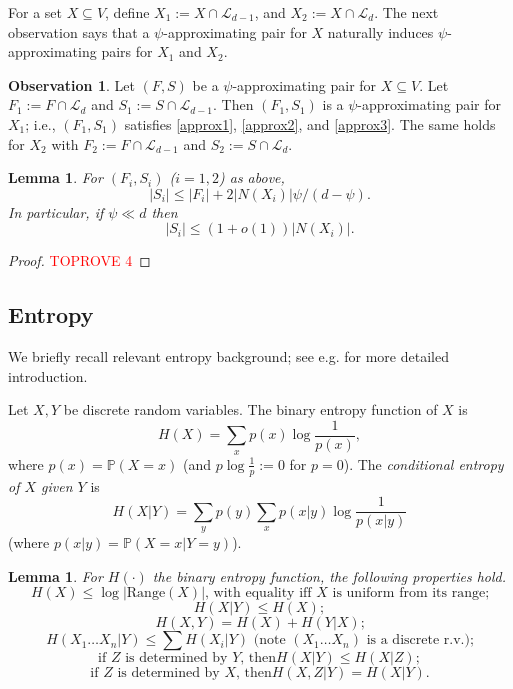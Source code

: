 \documentclass{amsart}
\newtheorem{lem}[thm]{Lemma}
\theoremstyle{definition}
\newtheorem{obs}[thm]{Observation}
\newcommand{\cL}{\mathcal{L} }
\newcommand{\beq}[1]{\begin{equation}\label{#1}}
\newcommand{\enq}[0]{\end{equation}}
\newcommand{\sub}[0]{\subseteq}
\newcommand{\0}[0]{\emptyset}
\newcommand{\pr}[0]{\mathbb{P}}
\begin{document}
For a set $X\subseteq V$, define $X_1:=X \cap \cL_{d-1}$, and $X_2:=X \cap \cL_d$. The next observation says that a $\psi$-approximating pair for $X$ naturally induces $\psi$-approximating pairs for $X_1$ and $X_2$.

\begin{obs}\label{prop:SFappro1}
Let $(F,S)$ be a $\psi$-approximating pair for $X \sub V$. Let $F_1:=F \cap \cL_d$ and $S_1:=S \cap \cL_{d-1}$. 
Then $(F_1, S_1)$ is a $\psi$-approximating pair for $X_1$; i.e., $(F_1,S_1)$ satisfies \eqref{approx1}, \eqref{approx2}, and \eqref{approx3}. The same holds for $X_2$ with $F_2 :=F \cap \cL_{d-1}$ and $S_2:=S \cap \cL_d$.
\end{obs}

\begin{lem}
For $(F_i,S_i)$ ($i=1,2$) as above,
\beq{S.F.gap} |S_i|\le |F_i|+2|N(X_i)|\psi/(d-\psi).\enq
In particular, if $\psi \ll d$ then
\beq{sf.ub} |S_i| \le (1+o(1))|N(X_i)|.\enq
\end{lem}

\begin{proof}\textcolor{red}{TOPROVE 4}\end{proof}





\subsection{Entropy} \label{Entropy}
We briefly recall relevant entropy background; see e.g. \cite{McEliece} for more detailed introduction.

Let $X, Y$ be discrete random variables. The binary entropy function of $X$ is
\[ H(X)=\sum_x p(x) \log {\frac{1}{p(x)}},\]
where $p(x)=\pr(X=x)$ (and $p \log \frac{1}{p} :=0$ for $p=0$).
The \emph{conditional entropy of $X$ given $Y$} is
\beq{condent}
H(X|Y)=\sum_y p(y)\sum_x p(x|y)\log \frac{1}{p(x|y)}
\enq
(where $p(x|y)=\pr(X=x|Y=y)$).



\begin{lem}\label{entropyprop} For $H(\cdot)$ the binary entropy function, the following properties hold.
\beq{entropyprop1} \mbox{$H(X) \le \log |\mbox{Range}(X)|$, with equality iff $X$ is uniform from its range;}\enq
\beq{entropyprop1.5} H(X|Y) \le H(X) ;\enq
\beq{entropyprop2} \mbox{$H(X,Y)=H(X)+H(Y|X)$;}\enq
\beq{entropyprop3} \mbox{$H(X_1\dots X_n|Y) \le \sum H(X_i|Y)$ (note $(X_1\dots X_n)$ is a discrete r.v.);} \enq
\beq{entropyprop4} \mbox{if $Z$ is determined by $Y$, then
$H(X|Y) \le H(X|Z)$}; \enq
\beq{entropyprop5} \mbox{if $Z$ is determined by $X$, then
$H(X,Z|Y) = H(X|Y)$.} \enq
\end{lem}
\end{document}
